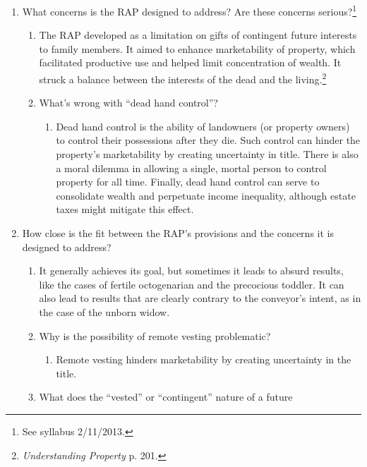 \begin{enumerate}
    \item What concerns is the RAP designed to address? Are these concerns 
    serious?\footnote{See syllabus 2/11/2013.}
    \begin{enumerate}
        \item The RAP developed as a limitation on gifts of contingent future 
        interests to family members. It aimed to enhance marketability of 
        property, which facilitated productive use and helped limit 
        concentration of wealth. It struck a balance between the interests of 
        the dead and the living.\footnote{\emph{Understanding Property} p. 
        201.}
        \item What's wrong with ``dead hand control''?
        \begin{enumerate}
            \item Dead hand control is the ability of landowners (or property 
            owners) to control their possessions after they die. Such control 
            can hinder the property's marketability by creating uncertainty in 
            title. There is also a moral dilemma in allowing a single, mortal 
            person to control property for all time. Finally, dead hand 
            control can serve to consolidate wealth and perpetuate income 
            inequality, although estate taxes might mitigate this effect.
        \end{enumerate}
    \end{enumerate}
    \item How close is the fit between the RAP's provisions and the concerns 
    it is designed to address?
    \begin{enumerate}
        \item It generally achieves its goal, but sometimes it leads to absurd 
        results, like the cases of fertile octogenarian and the precocious 
        toddler. It can also lead to results that are clearly contrary to the 
        conveyor's intent, as in the case of the unborn widow.
        \item Why is the possibility of remote vesting problematic?
        \begin{enumerate}
            \item Remote vesting hinders marketability by creating uncertainty 
            in the title. %
        \end{enumerate}
        \item What does the ``vested'' or ``contingent'' nature of a future 

\end{enumerate}
\end{enumerate}
